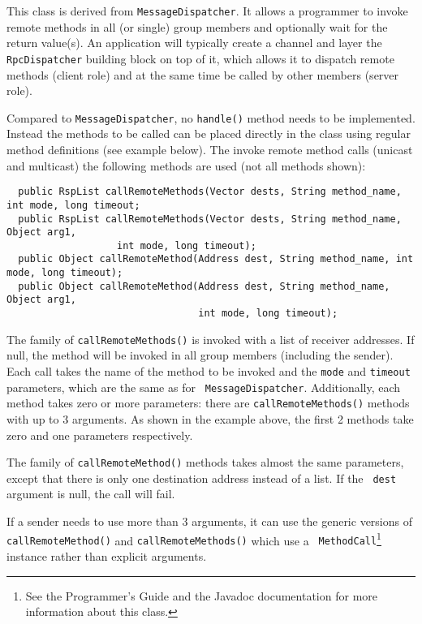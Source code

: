   This class is derived from {\tt MessageDispatcher}. It allows a programmer to invoke
  remote methods in all (or single) group members and optionally wait for the return
  value(s). An application will typically create a channel and layer the {\tt
  RpcDispatcher} building block on top of it, which allows it to dispatch remote
  methods (client role) and at the same time be called by other members (server
  role).

  Compared to {\tt MessageDispatcher}, no {\tt handle()} method needs to be
  implemented. Instead the methods to be called can be placed directly in the class
  using regular method definitions (see example below). The invoke remote method
  calls (unicast and multicast) the following methods are used (not all methods
  shown):

  \begin{small}
  \begin{verbatim}
  public RspList callRemoteMethods(Vector dests, String method_name, int mode, long timeout;
  public RspList callRemoteMethods(Vector dests, String method_name, Object arg1, 
				   int mode, long timeout);
  public Object callRemoteMethod(Address dest, String method_name, int mode, long timeout);
  public Object callRemoteMethod(Address dest, String method_name, Object arg1,
                                 int mode, long timeout);
  \end{verbatim}
  \end{small}

  The family of {\tt callRemoteMethods()} is invoked with a list of receiver
  addresses. If null, the method will be invoked in all group members (including the
  sender). Each call takes the name of the method to be invoked and the {\tt mode}
  and {\tt timeout} parameters, which are the same as for {\tt
  MessageDispatcher}. Additionally, each method takes zero or more parameters: there
  are {\tt callRemoteMethods()} methods with up to 3 arguments. As shown in the
  example above, the first 2 methods take zero and one parameters respectively.

  The family of {\tt callRemoteMethod()} methods takes almost the same parameters,
  except that there is only one destination address instead of a list. If the {\tt
  dest} argument is null, the call will fail.
  
  If a sender needs to use more than 3 arguments, it can use the generic versions of
  {\tt callRemoteMethod()} and {\tt callRemoteMethods()} which use a {\tt
  MethodCall}\footnote{See the Programmer's Guide and the Javadoc documentation for
  more information about this class.}  instance rather than explicit arguments.


